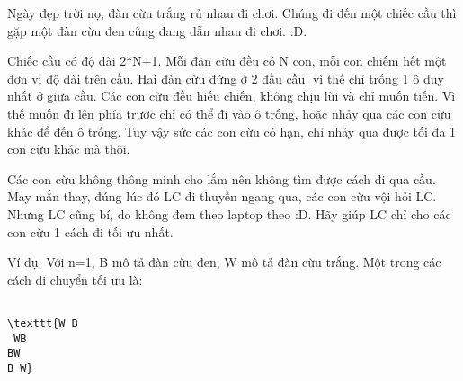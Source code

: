 Ngày đẹp trời nọ, đàn cừu trắng rủ nhau đi chơi. Chúng đi đến một chiếc cầu thì gặp một đàn cừu đen cũng đang dẫn nhau đi chơi. :D.

Chiếc cầu có độ dài 2*N+1. Mỗi đàn cừu đều có N con, mỗi con chiếm hết một đơn vị độ dài trên cầu. Hai đàn cừu đứng ở 2 đầu cầu, vì thế chỉ trống 1 ô duy nhất ở giữa cầu. Các con cừu đều hiếu chiến, không chịu lùi và chỉ muốn tiến. Vì thế muốn đi lên phía trước chỉ có thể đi vào ô trống, hoặc nhảy qua các con cừu khác để đến ô trống. Tuy vậy sức các con cừu có hạn, chỉ nhảy qua được tối đa 1 con cừu khác mà thôi.

Các con cừu không thông minh cho lắm nên không tìm được cách đi qua cầu. May mắn thay, đúng lúc đó LC đi thuyền ngang qua, các con cừu vội hỏi LC. Nhưng LC cũng bí, do không đem theo laptop theo :D. Hãy giúp LC chỉ cho các con cừu 1 cách đi tối ưu nhất.

Ví dụ: Với n=1, B mô tả đàn cừu đen, W mô tả đàn cừu trắng. Một trong các cách di chuyển tối ưu là:
\begin{verbatim}

\texttt{W B
 WB
BW 
B W}\end{verbatim}